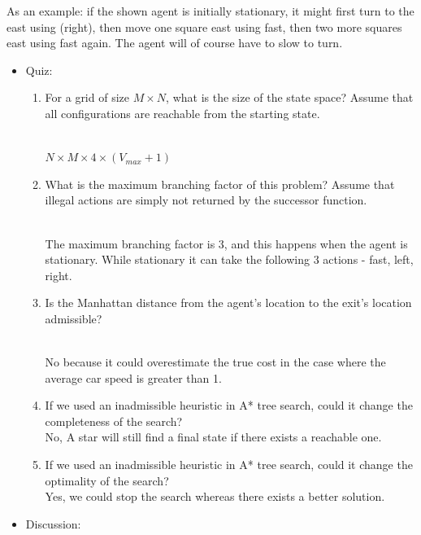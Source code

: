 \documentclass[9pt,a4paper]{extarticle}
\newenvironment{solution}
    {%
    \color{red}
    }
    { 
    \color{black}
    }
\begin{document}
As an example: if the shown agent is initially stationary, it might first turn to the east using (right), then
move one square east using fast, then two more squares east using fast again. The agent will of course have to
slow to turn.
\begin{itemize}
    \item Quiz:
    \begin{enumerate}
    \item For a grid of size $M \times N$, what is the size of the state space? Assume that all configurations are reachable from the starting state. 
    \begin{solution}
    \\
    $N \times M \times 4 \times (V_{max} + 1)$
    \end{solution}
    \item What is the maximum branching factor of this problem? Assume that illegal actions are simply not returned by the successor function.
    \begin{solution}
    \\
    The maximum branching factor is 3, and this happens when the agent is stationary. While stationary it
    can take the following 3 actions - fast, left, right.
    \end{solution}
    \item Is the Manhattan distance from the agent’s location to the exit’s location admissible?
    \begin{solution}
    \\
    No because it could overestimate the true cost in the case where the average car speed is greater than 1.
    \end{solution}
    \item If we used an inadmissible heuristic in A* tree search, could it change the completeness of the search?
    \begin{solution}\\
    No, A star will still find a final state if there exists a reachable one.
    \end{solution}
    \item If we used an inadmissible heuristic in A* tree search, could it change the optimality of the search?
    \begin{solution}\\
    Yes, we could stop the search whereas there exists a better solution.
    \end{solution}
    \end{enumerate}
    \item Discussion:

\end{itemize}
\end{document}
